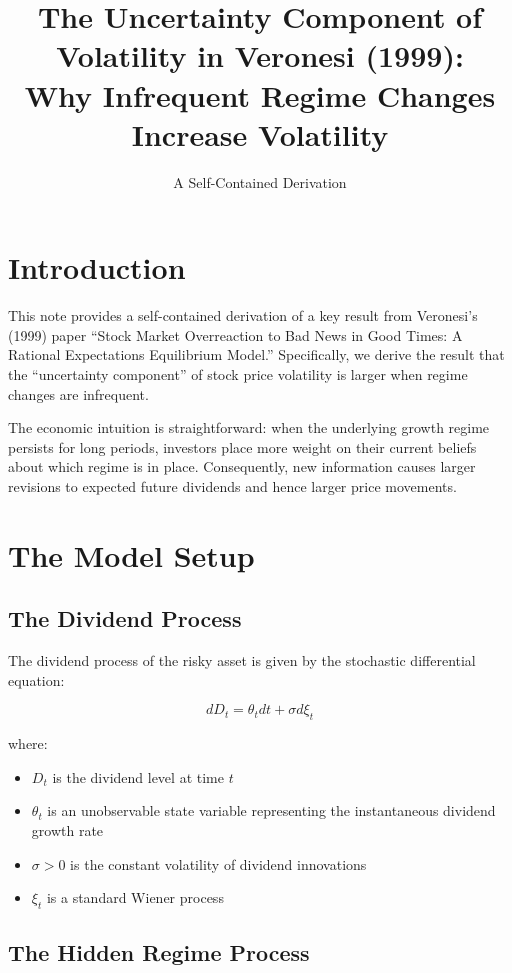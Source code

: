 \documentclass[12pt]{article}
\title{The Uncertainty Component of Volatility in Veronesi (1999):\\
       Why Infrequent Regime Changes Increase Volatility}
\author{A Self-Contained Derivation}
\date{}
\begin{document}
\maketitle

\section{Introduction}

This note provides a self-contained derivation of a key result from Veronesi's (1999) paper ``Stock Market Overreaction to Bad News in Good Times: A Rational Expectations Equilibrium Model.'' Specifically, we derive the result that the ``uncertainty component'' of stock price volatility is larger when regime changes are infrequent.

The economic intuition is straightforward: when the underlying growth regime persists for long periods, investors place more weight on their current beliefs about which regime is in place. Consequently, new information causes larger revisions to expected future dividends and hence larger price movements.

\section{The Model Setup}

\subsection{The Dividend Process}

The dividend process of the risky asset is given by the stochastic differential equation:

\begin{equation}
dD_t = \theta_t dt + \sigma d\xi_t \label{eq:dividend}
\end{equation}

where:
\begin{itemize}
    \item $D_t$ is the dividend level at time $t$
    \item $\theta_t$ is an unobservable state variable representing the instantaneous dividend growth rate
    \item $\sigma > 0$ is the constant volatility of dividend innovations
    \item $\xi_t$ is a standard Wiener process
\end{itemize}

\subsection{The Hidden Regime Process}
\end{document}
